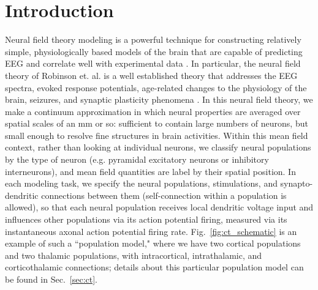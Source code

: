 \documentclass[preprint,review,10pt,authoryear,letterpaper]{elsarticle}
\begin{document}
\linenumbers

\section{Introduction}
\label{sec:introduction}
Neural field theory modeling is a powerful technique for constructing relatively simple, physiologically based models of the brain that are capable of predicting EEG and correlate well with experimental data \cite{Deco2008,Pinotsis2012}. In particular, the neural field theory of Robinson et. al. is a well established theory that addresses the EEG spectra, evoked response potentials, age-related changes to the physiology of the brain, seizures, and synaptic plasticity phenomena \citep{Robinson2005,Rowe2004413,PhysRevE.63.021903,PhysRevE.65.041924,Robinson:04aa,PhysRevE.68.021922,PhysRevE.70.011911,VanAlbada2010,Rennie2002,ker11,Breakspear2006}. In this neural field theory, we make a continuum approximation in which neural properties are averaged over spatial scales of an mm or so: sufficient to contain large numbers of neurons, but small enough to resolve fine structures in brain activities. Within this mean field context, rather than looking at individual neurons, we classify neural populations by the type of neuron (e.g. pyramidal excitatory neurons or inhibitory interneurons), and mean field quantities are label by their spatial position. In each modeling task, we specify the neural populations, stimulations, and synapto-dendritic connections between them (self-connection within a population is allowed), so that each neural population receives local dendritic voltage input and influences other populations via its action potential firing, measured via its instantaneous axonal action potential firing rate. Fig.~\ref{fig:ct_schematic} is an example of such a ``population model," where we have two cortical populations and two thalamic populations, with intracortical, intrathalamic, and corticothalamic connections; details about this particular population model can be found in Sec.~\ref{sec:ct}.
\end{document}
